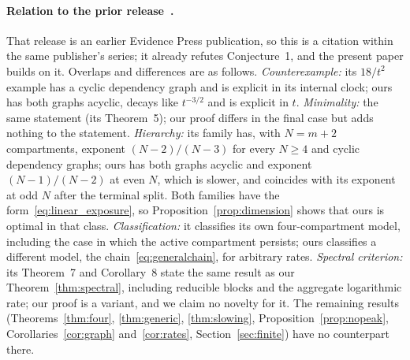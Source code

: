 \documentclass[11pt,a4paper]{article}
\theoremstyle{definition}\newtheorem{definition}[theorem]{Definition}
\theoremstyle{remark}\newtheorem{remark}[theorem]{Remark}
\begin{document}
\paragraph{Relation to the prior release~\cite{EPprior}.}
That release is an earlier Evidence Press publication, so this is a
citation within the same publisher's series; it already refutes
Conjecture~1, and the present paper builds on it. Overlaps and differences are as follows.
\emph{Counterexample:} its $18/t^2$ example has a cyclic dependency
graph and is explicit in its internal clock; ours has both graphs
acyclic, decays like $t^{-3/2}$ and is explicit in $t$.
\emph{Minimality:} the same statement (its Theorem~5); our proof differs
in the final case but adds nothing to the statement.
\emph{Hierarchy:} its family has, with $N=m+2$ compartments, exponent
$(N-2)/(N-3)$ for every $N\ge4$ and cyclic dependency graphs; ours has
both graphs acyclic and exponent $(N-1)/(N-2)$ at even $N$, which is
slower, and coincides with its exponent at odd $N$ after the terminal
split. Both families have the form~\eqref{eq:linear_exposure}, so
Proposition~\ref{prop:dimension} shows that ours is optimal in that class.
\emph{Classification:} it classifies its own four-compartment model,
including the case in which the active compartment persists; ours
classifies a different model, the chain~\eqref{eq:generalchain}, for
arbitrary rates. \emph{Spectral criterion:} its Theorem~7 and
Corollary~8 state the same result as our Theorem~\ref{thm:spectral},
including reducible blocks and the aggregate logarithmic rate; our proof
is a variant, and we claim no novelty for it. The remaining results
(Theorems~\ref{thm:four}, \ref{thm:generic}, \ref{thm:slowing},
Proposition~\ref{prop:nopeak}, Corollaries~\ref{cor:graph}
and~\ref{cor:rates}, Section~\ref{sec:finite}) have no counterpart there.
\end{document}
